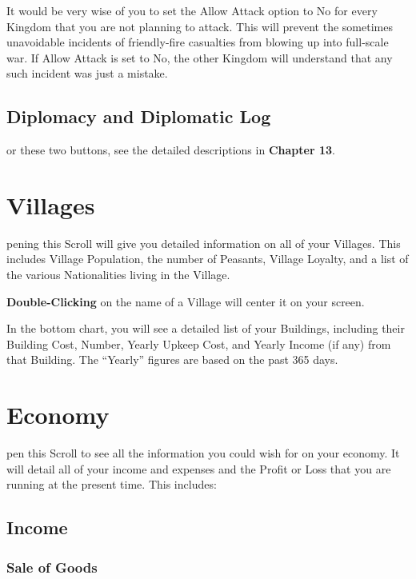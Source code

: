 It would be very wise of you to set the Allow Attack option to No for every Kingdom that you are not planning to attack. This will prevent the sometimes unavoidable incidents of friendly-fire casualties from blowing up into full-scale war. If Allow Attack is set to No, the other Kingdom will understand that any such incident was just a mistake.

\subsection{\textsf{Diplomacy and Diplomatic Log}}

or these two buttons, see the detailed descriptions in \textbf{Chapter 13}.

\section{\textsf{Villages}}


pening this Scroll will give you detailed information on all of your Villages. This includes Village Population, the number of Peasants, Village Loyalty, and a list of the various Nationalities living in the Village.

\textbf{Double-Clicking} on the name of a Village will center it on your screen.

In the bottom chart, you will see a detailed list of your Buildings, including their Building Cost, Number, Yearly Upkeep Cost, and Yearly Income (if any) from that Building. The “Yearly” figures are based on the past 365 days.

\section{\textsf{Economy}}


pen this Scroll to see all the information you could wish for on your economy. It will detail all of your income and expenses and the Profit or Loss that you are running at the present time. This includes:

\subsection{\textsf{Income}}


\subsubsection{\textsf{Sale of Goods}}

